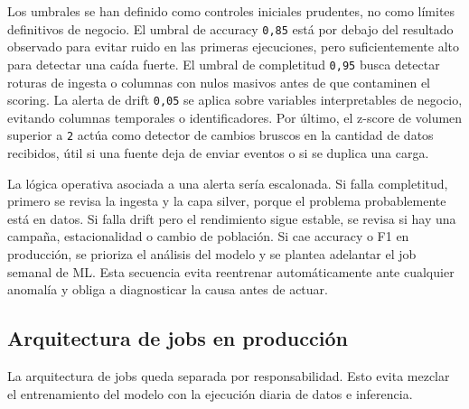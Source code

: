 \documentclass[12pt,a4paper]{article}
\begin{document}
Los umbrales se han definido como controles iniciales prudentes, no como límites definitivos de negocio. El umbral de accuracy \nolinkurl{0,85} está por debajo del resultado observado para evitar ruido en las primeras ejecuciones, pero suficientemente alto para detectar una caída fuerte. El umbral de completitud \nolinkurl{0,95} busca detectar roturas de ingesta o columnas con nulos masivos antes de que contaminen el scoring. La alerta de drift \nolinkurl{0,05} se aplica sobre variables interpretables de negocio, evitando columnas temporales o identificadores. Por último, el z-score de volumen superior a \nolinkurl{2} actúa como detector de cambios bruscos en la cantidad de datos recibidos, útil si una fuente deja de enviar eventos o si se duplica una carga.\par

La lógica operativa asociada a una alerta sería escalonada. Si falla completitud, primero se revisa la ingesta y la capa silver, porque el problema probablemente está en datos. Si falla drift pero el rendimiento sigue estable, se revisa si hay una campaña, estacionalidad o cambio de población. Si cae accuracy o F1 en producción, se prioriza el análisis del modelo y se plantea adelantar el job semanal de ML. Esta secuencia evita reentrenar automáticamente ante cualquier anomalía y obliga a diagnosticar la causa antes de actuar.\par

\subsection{Arquitectura de jobs en producción}

La arquitectura de jobs queda separada por responsabilidad. Esto evita mezclar el entrenamiento del modelo con la ejecución diaria de datos e inferencia.\par
\end{document}

